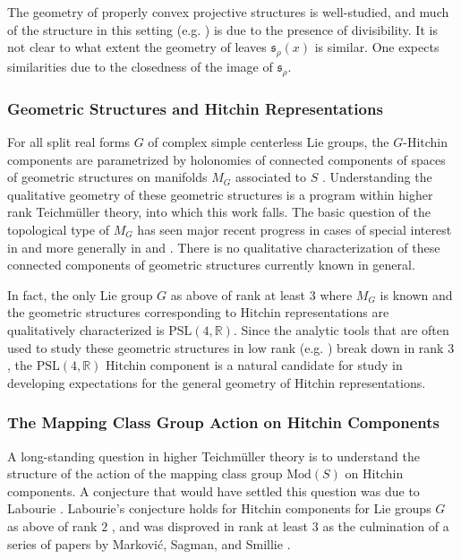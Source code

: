 \documentclass[12pt,a4paper]{amsart}
\theoremstyle{definition}
\theoremstyle{plain}
\numberwithin{equation}{section}
\begin{document}
The geometry of properly convex projective structures is well-studied, and much of the structure in this setting (e.g. \cite{benoist2004convexesI} \cite{guichard2005regularity}) is due to the presence of divisibility. It is not clear to what extent the geometry of leaves $\mathfrak{s}_\rho(x)$ is similar. One expects similarities due to the closedness of the image of $\mathfrak{s}_\rho$.

\subsubsection{Geometric Structures and Hitchin Representations}

For all split real forms $G$ of complex simple centerless Lie groups, the $G$-Hitchin components are parametrized by holonomies of connected components of spaces of geometric structures on manifolds $M_G$ associated to $S$ \cite{guichard2012anosov}. Understanding the qualitative geometry of these geometric structures is a program within higher rank Teichm\"uller theory, into which this work falls. The basic question of the topological type of $M_G$ has seen major recent progress in cases of special interest in \cite{alessandriniDavaloLi2021projective} and more generally in \cite{alessandrini2023fiber} and \cite{davalo2023nearly}. There is no qualitative characterization of these connected components of geometric structures currently known in general.

In fact, the only Lie group $G$ as above of rank at least $3$ where $M_G$ is known and the geometric structures corresponding to Hitchin representations are qualitatively characterized is $\text{PSL}(4, \mathbb{R})$. Since the analytic tools that are often used to study these geometric structures in low rank (e.g. \cite{collierToulisseTholozan2019geometry}) break down in rank $3$ \cite{sagman2022unstable}, the $\text{PSL}(4, \mathbb{R})$ Hitchin component is a natural candidate for study in developing expectations for the general geometry of Hitchin representations. 

\subsubsection{The Mapping Class Group Action on Hitchin Components}

A long-standing question in higher Teichm\"uller theory is to understand the structure of the action of the mapping class group $\text{Mod}(S)$ on Hitchin components. A conjecture that would have settled this question was due to Labourie \cite{labourie2008cross}. Labourie's conjecture holds for Hitchin components for Lie groups $G$ as above of rank $2$ \cite{labourie2017cyclic}, and was disproved in rank at least $3$ as the culmination of a series of papers by Markovi\'c, Sagman, and Smillie \cite{markovic2022non} \cite{markovic2022unstable} \cite{sagman2022unstable}.
\end{document}
